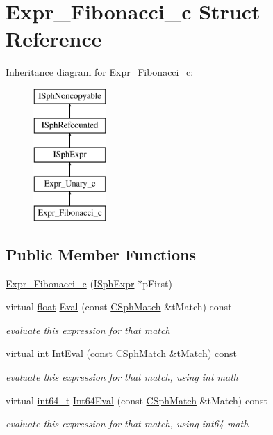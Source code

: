 \hypertarget{structExpr__Fibonacci__c}{\section{Expr\-\_\-\-Fibonacci\-\_\-c Struct Reference}
\label{structExpr__Fibonacci__c}
}
Inheritance diagram for Expr\-\_\-\-Fibonacci\-\_\-c\-:\begin{figure}[H]
\begin{center}
\leavevmode
\includegraphics[height=5.000000cm]{structExpr__Fibonacci__c}
\end{center}
\end{figure}
\subsection*{Public Member Functions}
\begin{DoxyCompactItemize}
\item 
\hyperlink{structExpr__Fibonacci__c_a3ecd177d57ed7deea70608310b3ccde4}{Expr\-\_\-\-Fibonacci\-\_\-c} (\hyperlink{structISphExpr}{I\-Sph\-Expr} $\ast$p\-First)
\item 
virtual \hyperlink{sphinxexpr_8cpp_a0e0d0739f7035f18f949c2db2c6759ec}{float} \hyperlink{structExpr__Fibonacci__c_ae05ea8171435cf204a4725e599cc93b8}{Eval} (const \hyperlink{classCSphMatch}{C\-Sph\-Match} \&t\-Match) const 
\begin{DoxyCompactList}\small\item\em evaluate this expression for that match \end{DoxyCompactList}\item 
virtual \hyperlink{sphinxexpr_8cpp_a4a26e8f9cb8b736e0c4cbf4d16de985e}{int} \hyperlink{structExpr__Fibonacci__c_ac3757eb6b79ca2cf19693b6cef477d81}{Int\-Eval} (const \hyperlink{classCSphMatch}{C\-Sph\-Match} \&t\-Match) const 
\begin{DoxyCompactList}\small\item\em evaluate this expression for that match, using int math \end{DoxyCompactList}\item 
virtual \hyperlink{sphinxstd_8h_a996e72f71b11a5bb8b3b7b6936b1516d}{int64\-\_\-t} \hyperlink{structExpr__Fibonacci__c_a5c7129025d59a82842524863223e17d7}{Int64\-Eval} (const \hyperlink{classCSphMatch}{C\-Sph\-Match} \&t\-Match) const 
\begin{DoxyCompactList}\small\item\em evaluate this expression for that match, using int64 math \end{DoxyCompactList}\end{DoxyCompactItemize}
